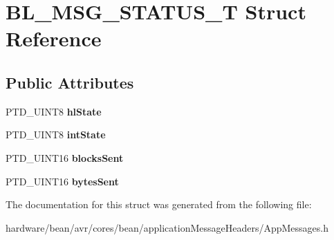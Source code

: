 \hypertarget{struct_b_l___m_s_g___s_t_a_t_u_s___t}{}\section{B\+L\+\_\+\+M\+S\+G\+\_\+\+S\+T\+A\+T\+U\+S\+\_\+T Struct Reference}
\label{struct_b_l___m_s_g___s_t_a_t_u_s___t}
\subsection*{Public Attributes}
\begin{DoxyCompactItemize}
\item 
P\+T\+D\+\_\+\+U\+I\+N\+T8 {\bfseries hl\+State}\hypertarget{struct_b_l___m_s_g___s_t_a_t_u_s___t_a4effec1e63765a35393842da0b99ef6b}{}\label{struct_b_l___m_s_g___s_t_a_t_u_s___t_a4effec1e63765a35393842da0b99ef6b}

\item 
P\+T\+D\+\_\+\+U\+I\+N\+T8 {\bfseries int\+State}\hypertarget{struct_b_l___m_s_g___s_t_a_t_u_s___t_a16c3b44d869de82f5f87ea0b1335f8b5}{}\label{struct_b_l___m_s_g___s_t_a_t_u_s___t_a16c3b44d869de82f5f87ea0b1335f8b5}

\item 
P\+T\+D\+\_\+\+U\+I\+N\+T16 {\bfseries blocks\+Sent}\hypertarget{struct_b_l___m_s_g___s_t_a_t_u_s___t_a7fd8df74353b15d8ea4d58cf5baca701}{}\label{struct_b_l___m_s_g___s_t_a_t_u_s___t_a7fd8df74353b15d8ea4d58cf5baca701}

\item 
P\+T\+D\+\_\+\+U\+I\+N\+T16 {\bfseries bytes\+Sent}\hypertarget{struct_b_l___m_s_g___s_t_a_t_u_s___t_ac1f0614b561e348afd6e16648690ff9e}{}\label{struct_b_l___m_s_g___s_t_a_t_u_s___t_ac1f0614b561e348afd6e16648690ff9e}

\end{DoxyCompactItemize}


The documentation for this struct was generated from the following file\+:\begin{DoxyCompactItemize}
\item 
hardware/bean/avr/cores/bean/application\+Message\+Headers/App\+Messages.\+h\end{DoxyCompactItemize}
